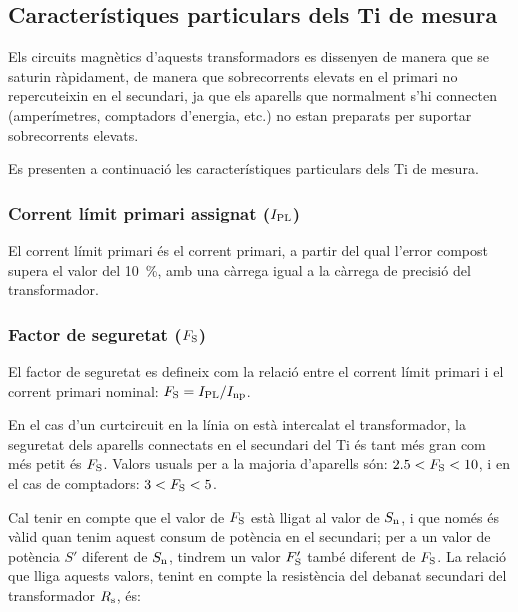 \subsection{Característiques particulars dels Ti de mesura}

Els circuits magnètics d'aquests transformadors es dissenyen de
manera que se saturin ràpidament, de manera que
sobrecorrents elevats en el primari  no repercuteixin en el secundari,
ja que els aparells que normalment s'hi connecten (amperímetres,
comptadors d'energia, etc.) no estan preparats per suportar
sobrecorrents elevats.

Es presenten a continuació les característiques particulars dels Ti
de mesura.

\subsubsection{Corrent límit primari  assignat ($I_\mathrm{PL}$)}

El corrent  límit primari
és el corrent primari, a partir del qual l'error compost supera el valor del \SI{10}{\percent}, amb una càrrega igual a la càrrega de
precisió del transformador.

\subsubsection{Factor de seguretat ($F_\mathrm{S}$) }

 El factor de seguretat
es defineix com la relació entre el corrent límit primari
i el corrent primari nominal: $F_\mathrm{S} = I_\mathrm{PL} / I_\mathrm{np}$.

En el cas d'un curtcircuit en la línia on està intercalat el
transformador, la seguretat dels aparells connectats en el secundari
del Ti és tant més gran com més petit és  $F_\mathrm{S}$. Valors usuals
per a la majoria d'aparells són:  $\num{2,5}<F_\mathrm{S}<10$, i en el cas de comptadors: $3<F_\mathrm{S}<5$.

Cal tenir en compte que el valor de $F_\mathrm{S}$ està lligat
 al valor de $S_\mathrm{n}$, i que només és vàlid
quan tenim aquest consum de  potència en el secundari; per a un
valor de potència $S'$ diferent de $S_\mathrm{n}$, tindrem un valor
$F'_\mathrm{S}$ també diferent de  $F_\mathrm{S}$. La relació que
lliga aquests valors, tenint en compte la resistència del debanat
secundari del transformador  $R_\mathrm{s}$, és:

